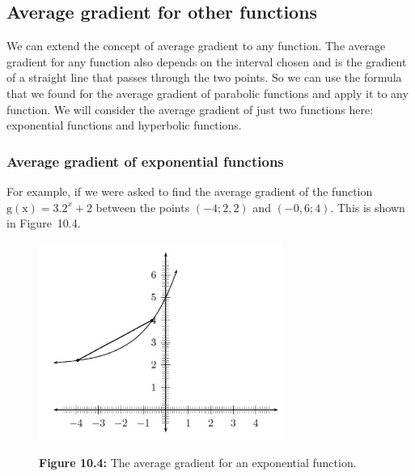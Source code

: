             \subsection{ Average gradient for other functions}
            \nopagebreak
\label{m39223*id7342}We can extend the concept of average gradient to any function. The average gradient for any function also depends on the interval chosen and is the gradient of a straight line that passes through the two points. So we can use the formula that we found for the average gradient of parabolic functions and apply it to any function. We will consider the average gradient of just two functions here: exponential functions and hyperbolic functions.
\par 
\label{m39223*cid452}
            \subsubsection{ Average gradient of exponential functions}
            \nopagebreak
\label{m39223*id734}For example, if we were asked to find the average gradient of the function $\mathrm{g\left(x\right)}=3.{2}^{x}+2$ between the points $\left(-4;\mathrm{2,2}\right)$ and $\left(-0,6;4\right)$. This is shown in Figure~10.4. 
    \setcounter{subfigure}{0}
	\begin{figure}[H] %
    \begin{center}
    \label{m39223*uid31!!!underscore!!!media}\label{m39223*uid31!!!underscore!!!printimage}\includegraphics[width=300px]{col11306.imgs/m39223_exponent.png} %
      \vspace{2pt}
    \vspace{\rubberspace}\par \begin{cnxcaption}
	  \small \textbf{Figure 10.4: }The average gradient for an exponential function.
	\end{cnxcaption}
    \vspace{.1in}
    \end{center}
 \end{figure}       
